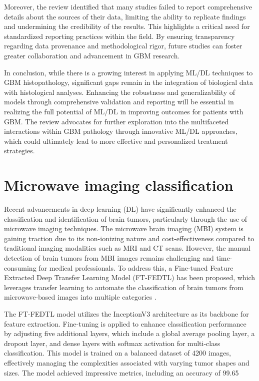 \documentclass[runningheads]{llncs}
\begin{document}
Moreover, the review identified that many studies failed to report comprehensive details about the sources of their data, limiting the ability to replicate findings and undermining the credibility of the results. This highlights a critical need for standardized reporting practices within the field. By ensuring transparency regarding data provenance and methodological rigor, future studies can foster greater collaboration and advancement in GBM research.

In conclusion, while there is a growing interest in applying ML/DL techniques to GBM histopathology, significant gaps remain in the integration of biological data with histological analyses. Enhancing the robustness and generalizability of models through comprehensive validation and reporting will be essential in realizing the full potential of ML/DL in improving outcomes for patients with GBM. The review advocates for further exploration into the multifaceted interactions within GBM pathology through innovative ML/DL approaches, which could ultimately lead to more effective and personalized treatment strategies.
\section{Microwave imaging classification}
Recent advancements in deep learning (DL) have significantly enhanced the classification and identification of brain tumors, particularly through the use of microwave imaging techniques. The microwave brain imaging (MBI) system is gaining traction due to its non-ionizing nature and cost-effectiveness compared to traditional imaging modalities such as MRI and CT scans. However, the manual detection of brain tumors from MBI images remains challenging and time-consuming for medical professionals. To address this, a Fine-tuned Feature Extracted Deep Transfer Learning Model (FT-FEDTL) has been proposed, which leverages transfer learning to automate the classification of brain tumors from microwave-based images into multiple categories \cite{Amran_2024}.

The FT-FEDTL model utilizes the InceptionV3 architecture as its backbone for feature extraction. Fine-tuning is applied to enhance classification performance by adjusting five additional layers, which include a global average pooling layer, a dropout layer, and dense layers with softmax activation for multi-class classification. This model is trained on a balanced dataset of 4200 images, effectively managing the complexities associated with varying tumor shapes and sizes. The model achieved impressive metrics, including an accuracy of 99.65%
\end{document}
